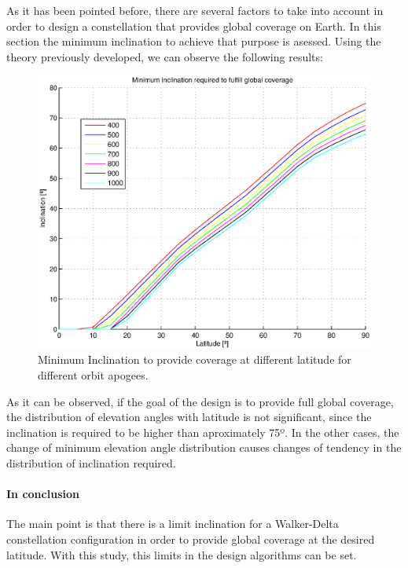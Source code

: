 As it has been pointed before, there are several factors to take into account in order to design a constellation that provides global coverage on Earth. In this section the minimum inclination to achieve that purpose is asessed. Using the theory previously developed, we can observe the following results:

\begin{figure}[H]
	\includegraphics[scale=0.8]{MinimumInclinationPlot}
	\caption{Minimum Inclination to provide coverage at different latitude for different orbit apogees.}	
\end{figure}

As it can be observed, if the goal of the design is to provide full global coverage, the distribution of elevation angles with latitude is not significant, since the inclination is required to be higher than aproximately 75º. In the other cases, the change of minimum elevation angle distribution causes changes of tendency in the distribution of inclination required. 

\paragraph{In conclusion\\}
The main point is that there is a limit inclination for a Walker-Delta constellation configuration in order to provide global coverage at the desired latitude. With this study, this limits in the design algorithms can be set.
